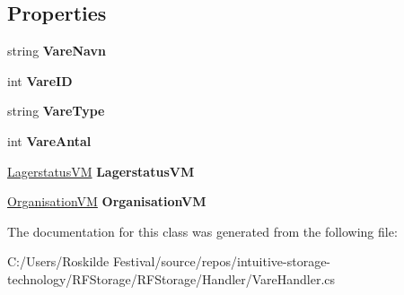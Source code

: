 \subsection*{Properties}
\begin{DoxyCompactItemize}
\item 
\mbox{\label{class_r_f_storage_1_1_handler_1_1_vare_handler_a3ea0e8fdd24da2245c7210d3c629e4ff}} 
string {\bfseries Vare\+Navn}
\item 
\mbox{\label{class_r_f_storage_1_1_handler_1_1_vare_handler_a8ac49cb3670e6bf948bf634eeec92536}} 
int {\bfseries Vare\+ID}
\item 
\mbox{\label{class_r_f_storage_1_1_handler_1_1_vare_handler_ad1cf2e1e42aad325e03adb06bd9b719c}} 
string {\bfseries Vare\+Type}
\item 
\mbox{\label{class_r_f_storage_1_1_handler_1_1_vare_handler_adae011fe3de38eec53325b7077b0ebfa}} 
int {\bfseries Vare\+Antal}
\item 
\mbox{\label{class_r_f_storage_1_1_handler_1_1_vare_handler_a004787d0a364642ee72840656ca062cd}} 
\mbox{\hyperlink{class_r_f_storage_1_1_view_model_1_1_lagerstatus_v_m}{Lagerstatus\+VM}} {\bfseries Lagerstatus\+VM}
\item 
\mbox{\label{class_r_f_storage_1_1_handler_1_1_vare_handler_a0139d467ca2c845dc0a22e3b9df7b1c1}} 
\mbox{\hyperlink{class_r_f_storage_1_1_view_model_1_1_organisation_v_m}{Organisation\+VM}} {\bfseries Organisation\+VM}
\end{DoxyCompactItemize}


The documentation for this class was generated from the following file\+:\begin{DoxyCompactItemize}
\item 
C\+:/\+Users/\+Roskilde Festival/source/repos/intuitive-\/storage-\/technology/\+R\+F\+Storage/\+R\+F\+Storage/\+Handler/Vare\+Handler.\+cs\end{DoxyCompactItemize}
